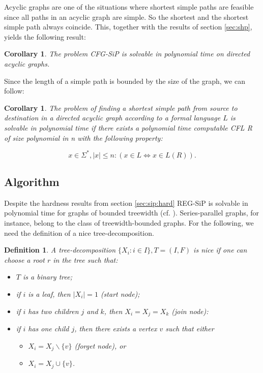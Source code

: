 \documentclass[]{article}
\newtheorem{definition}[theorem]{Definition}
\newtheorem{corollary}[theorem]{Corollary}
\numberwithin{equation}{section}
\begin{document}
Acyclic graphs are one of the situations where shortest simple paths are feasible since all paths in an acyclic graph are simple. So the shortest and the shortest simple path always coincide. This, together with the results of section \ref{sec:shp}, yields the following result:

\begin{corollary}
	The problem CFG-SiP is solvable in polynomial time on directed acyclic graphs.
\end{corollary}

Since the length of a simple path is bounded by the size of the graph, we can follow:

\begin{corollary}
	The problem of finding a shortest simple path from source to destination in a directed acyclic graph according to a formal language $L$ is solvable in polynomial time if there exists a polynomial time computable CFL R of size polynomial in n with the following property:
	
	$$x\in\Sigma^*, |x|\leq n: (x\in L \iff x\in L(R)).$$
\end{corollary}

\subsection{Algorithm}

Despite the hardness results from section \ref{sec:sip:hard} REG-SiP is solvable in polynomial time for graphs of bounded treewidth (cf. \cite{BJM00}). Series-parallel graphs, for instance, belong to the class of treewidth-bounded graphs. For the following, we need the definition of a nice tree-decomposition.

\begin{definition}
	A tree-decomposition $\{X_i:i\in I\}, T=(I,F)$ is nice if one
	can choose a root $r$ in the tree such that:
	\begin{itemize}
		\item $T$ is a binary tree;
		\item if $i$ is a leaf, then $|X_i|=1$ (start node);
		\item if $i$ has two children $j$ and $k$, then $X_i=X_j=X_k$ (join node):
		\item if $i$ has one child $j$, then there exists a vertex $v$ such that either
		\begin{itemize}
			\item $X_i=X_j\backslash\{v\}$ (forget node), or
			\item $X_i=X_j\cup\{v\}$.
		\end{itemize}
	\end{itemize}
\end{definition}
\end{document}
